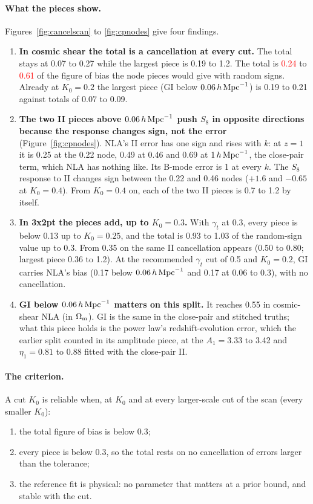 \documentclass[11pt]{article}
\newcommand{\hMpc}{\,h\,{\rm Mpc}^{-1}}
\newcommand{\Om}{\Omega_{\rm m}}
\newif\ifnumbersfinal
\newcommand{\refresh}[1]{\ifnumbersfinal#1\else\textcolor{red}{#1}\fi}
\newcommand{\CPcancCSLo}{\refresh{0.24}}
\newcommand{\CPcancCSHi}{\refresh{0.61}}
\newcommand{\Tol}{0.3}
\begin{document}
\paragraph{What the pieces show.}
Figures~\ref{fig:cancelscan} to \ref{fig:cpnodes} give four findings.
\begin{enumerate}
  \item \textbf{In cosmic shear the total is a cancellation at every cut.}
    The total stays at 0.07 to 0.27 while the largest piece is 0.19 to 1.2.
    The total is \CPcancCSLo{} to \CPcancCSHi{} of the figure of bias the
    node pieces would give with random signs. Already at $K_0 = 0.2$ the
    largest piece (GI below $0.06\hMpc$) is 0.19 to 0.21 against totals of
    0.07 to 0.09.
  \item \textbf{The two II pieces above $0.06\hMpc$ push $S_8$ in opposite
    directions because the response changes sign, not the error}
    (Figure~\ref{fig:cpnodes}). NLA's II error has one sign and rises with
    $k$: at $z = 1$ it is 0.25 at the 0.22 node, 0.49 at 0.46 and 0.69 at
    $1\hMpc$, the close-pair term, which NLA has nothing like. Its B-mode
    error is 1 at every $k$. The $S_8$ response to II changes sign between
    the 0.22 and 0.46 nodes ($+1.6$ and $-0.65$ at $K_0 = 0.4$). From $K_0 =
    0.4$ on, each of the two II pieces is 0.7 to 1.2 by itself.
  \item \textbf{In 3x2pt the pieces add, up to $K_0 = 0.3$.} With $\gamma_t$
    at 0.3, every piece is below 0.13 up to $K_0 = 0.25$, and the total is
    0.93 to 1.03 of the random-sign value up to 0.3. From 0.35 on the same
    II cancellation appears (0.50 to 0.80; largest piece 0.36 to 1.2). At the
    recommended $\gamma_t$ cut of 0.5 and $K_0 = 0.2$, GI carries NLA's
    bias (0.17 below $0.06\hMpc$ and 0.17 at 0.06 to 0.3), with no
    cancellation.
  \item \textbf{GI below $0.06\hMpc$ matters on this split.} It reaches 0.55
    in cosmic-shear NLA (in $\Om$). GI is the same in the close-pair and
    stitched truths; what this piece holds is the power law's
    redshift-evolution error, which the earlier split counted in its
    amplitude piece, at the $A_1 = 3.33$ to 3.42 and $\eta_1 = 0.81$ to
    0.88 fitted with the close-pair II.
\end{enumerate}

\paragraph{The criterion.}
A cut $K_0$ is reliable when, at $K_0$ and at every larger-scale cut of
the scan (every smaller $K_0$):
\begin{enumerate}
  \item the total figure of bias is below \Tol;
  \item every piece is below \Tol, so the total rests on no cancellation of
    errors larger than the tolerance;
  \item the reference fit is physical: no parameter that matters at a prior
    bound, and stable with the cut.
\end{enumerate}
\end{document}
